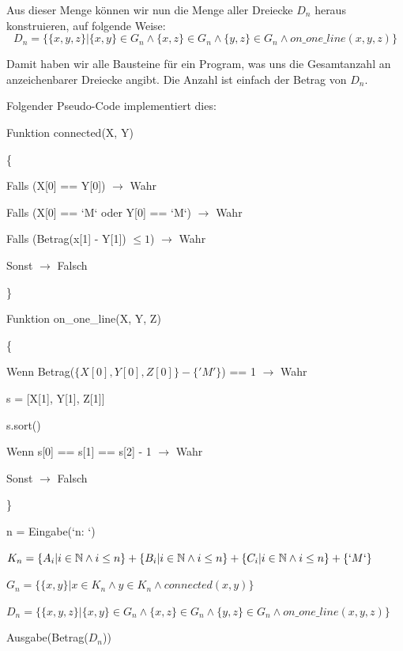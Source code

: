\documentclass[11pt]{article}
\begin{document}
    Aus dieser Menge können wir nun die Menge aller Dreiecke $D_n$ heraus konstruieren, auf folgende Weise:
    \[D_n = \{\{x, y, z\} \vert \{x, y\} \in G_n \land \{x, z\} \in G_n \land \{y, z\} \in G_n \land on\_one\_line(x, y, z)\}\]

    Damit haben wir alle Bausteine für ein Program, was uns die Gesamtanzahl an anzeichenbarer Dreiecke angibt.
    Die Anzahl ist einfach der Betrag von $D_n$.

    Folgender Pseudo-Code implementiert dies:

    \begin{tcolorbox}

        Funktion connected(X, Y)

        \{

            Falls (X[0] == Y[0]) $\rightarrow$ Wahr

            Falls (X[0] == `M` oder Y[0] == `M`) $\rightarrow$ Wahr

            Falls (Betrag(x[1] - Y[1]) $\le 1$) $\rightarrow$ Wahr

            Sonst $\rightarrow$ Falsch

        \}

        \bigskip

        Funktion on\_one\_line(X, Y, Z)

        \{

            Wenn Betrag($\{X[0], Y[0], Z[0]\} - \{'M'\}$) == 1 $\rightarrow$ Wahr

            s = [X[1], Y[1], Z[1]]

            s.sort()

            Wenn s[0] == s[1] == s[2] - 1 $\rightarrow$ Wahr

            Sonst $\rightarrow$ Falsch

        \}

        \bigskip

        n = Eingabe(`n: `)

        $K_n = \{A_i | i \in \mathbb{N} \land i \le n\} + \{B_i | i \in \mathbb{N} \land i \le n\} + \{C_i | i \in \mathbb{N} \land i \le n\} + \{`M`\}$

        $G_n = \{\{x, y\} | x \in K_n \land y \in K_n \land connected(x, y)\}$

        $D_n = \{\{x, y, z\} \vert \{x, y\} \in G_n \land \{x, z\} \in G_n \land \{y, z\} \in G_n \land on\_one\_line(x, y, z)\}$

        Ausgabe(Betrag($D_n$))

    \end{tcolorbox}
\end{document}
